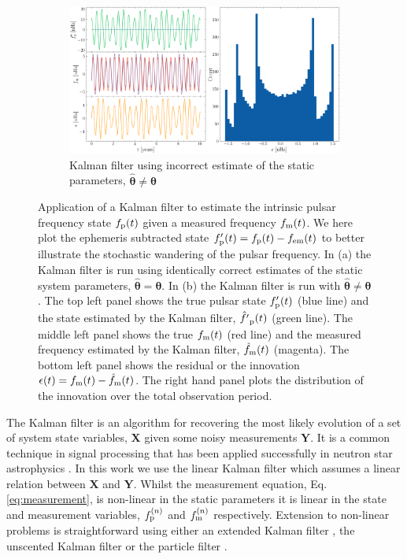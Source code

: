 \documentclass[fleqn,usenatbib,useAMS]{mnras}
\begin{document}
\begin{figure}
	\begin{subfigure}[b]{1\textwidth}
		\includegraphics[width=\textwidth]{images/Kalman_example_wrong_params}
		\caption{Kalman filter using incorrect estimate of the static parameters, $\hat{\boldsymbol{\theta}} \neq \boldsymbol{\theta}$}
		\label{fig:25MB_bfs}
	\end{subfigure}
	\caption{Application of a Kalman filter to estimate the intrinsic pulsar frequency state $f_{\rm p}(t)$ given a measured frequency $f_{\rm m}(t)$. We here plot the ephemeris subtracted state $f'_{\rm p}(t) = f_{\rm p}(t) - f_{\rm em} (t)$ to better illustrate the stochastic wandering of the pulsar frequency. In (a) the Kalman filter is run using identically correct estimates of the static system parameters, $\hat{\boldsymbol{\theta}} = \boldsymbol{\theta}$. In (b) the Kalman filter is run with $\hat{\boldsymbol{\theta}} \neq \boldsymbol{\theta}$. The top left panel shows the true pulsar state $f'_{\rm p}(t)$ (blue line) and the state estimated by the Kalman filter, $\hat{f'}_{\rm p}(t)$ (green line). The middle left panel shows the true $f_{\rm m}(t)$ (red line) and the measured frequency estimated  by the Kalman filter, $\hat{f}_{\rm m}(t)$ (magenta). The bottom left panel shows the residual or the innovation $\epsilon(t) =f_{\rm m}(t) - \hat{f}_{\rm m}(t)$. The right hand panel plots the distribution of the innovation over the total observation period.}
	\label{fig:four figures}
\end{figure}

The Kalman filter \citep{Kalman1} is an algorithm for recovering the most likely evolution of a set of system state variables, $\boldsymbol{X}$ given some noisy measurements $\boldsymbol{Y}$. It is a common technique in signal processing that has been applied successfully in neutron star astrophysics \citep[e.g.][]{Meyers2021,Melatos2023}. In this work we use the linear Kalman filter which assumes a linear relation between $\boldsymbol{X}$ and $\boldsymbol{Y}$. Whilst the measurement equation, Eq. \ref{eq:measurement}, is non-linear in the static parameters it is linear in the state and measurement variables, $f_{\rm p}^{(n)}$ and $f_{\rm m}^{(n)}$ respectively. Extension to non-linear problems is straightforward using either an extended Kalman filter \citep{zarchan2000fundamentals}, the unscented Kalman filter \citep{882463van} or the particle filter \citep{Simon10}. \newline 
\end{document}
